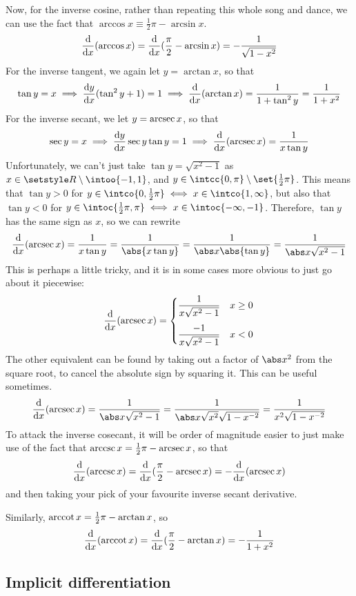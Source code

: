 Now, for the inverse cosine, rather than repeating this whole song and
dance, we can use the fact that
\(\arccos x \equiv \frac 12 \pi - \arcsin x\).
\begin{equation*}
\dv{x}(\arccos x) = \dv{x}(\frac \pi 2 - \arcsin x)
    = -\frac 1{\sqrt{1 - x^2}}
\end{equation*}
For the inverse tangent, we again let \(y = \arctan x\), so that
\begin{equation*}
\tan y = x \implies \dv<y>{x}(\tan^2 y + 1) = 1
    \implies \dv{x}(\arctan x) = \frac 1{1 + \tan^2 y}
        = \frac 1{1 + x^2}
\end{equation*}
For the inverse secant, we let \(y = \operatorname{arcsec} x\), so that
\begin{equation*}
\sec y = x \implies \dv<y>{x} \sec y \tan y = 1
    \implies \dv{x}(\arcsec x) = \frac 1{x \tan y}
\end{equation*}
Unfortunately, we can't just take \(\tan y = \sqrt{x^2 - 1}\) as
\(x \in \Reals \setminus \intoo{-1, 1}\), and
\(y \in \intcc{0, \pi} \setminus \set{\frac 12 \pi}\). This means that
\(\tan y > 0\) for
\(y \in \intco{0, \frac 12 \pi} \iff x \in \intco{1, \infty}\), but also
that \(\tan y < 0\) for
\(y \in \intoc{\frac 12 \pi, \pi} \iff x \in \intoc{-\infty, -1}\).
Therefore, \(\tan y\) has the same sign as \(x\), so we can rewrite
\begin{equation*}
\dv{x}(\arcsec x) = \frac 1{x \tan y} = \frac 1{\abs{x \tan y}}
    = \frac 1{\abs x\abs{\tan y}} = \frac 1{\abs x\sqrt{x^2 - 1}}
\end{equation*}
This is perhaps a little tricky, and it is in some cases more obvious to
just go about it piecewise:
\begin{equation*}
\dv{x}(\arcsec x) = \begin{cases}
    \dfrac 1{x\sqrt{x^2 - 1}} & x \ge 0 \\[3ex]
    \dfrac {-1}{x\sqrt{x^2 - 1}} & x < 0
\end{cases}
\end{equation*}
The other equivalent can be found by taking out a factor of \(\abs x^2\)
from the square root, to cancel the absolute sign by squaring it. This can
be useful sometimes.
\begin{equation*}
\dv{x}(\arcsec x) = \frac 1{\abs x\sqrt{x^2 - 1}}
    = \frac 1{\abs x\sqrt{x^2}\sqrt{1 - x^{-2}}}
    = \frac 1{x^2\sqrt{1 - x^{-2}}}
\end{equation*}
To attack the inverse cosecant, it will be order of magnitude easier to just
make use of the fact that \(\operatorname{arccsc} x = \frac 12 \pi - \operatorname{arcsec} x\),
so that
\begin{equation*}
\dv{x}(\arccsc x) = \dv{x}(\frac \pi 2 - \arcsec x) = -\dv{x}(\arcsec x)
\end{equation*}
and then taking your pick of your favourite inverse secant derivative.

Similarly, \(\operatorname{arccot} x = \frac 12 \pi - \arctan x\), so
\begin{equation*}
\dv{x}(\arccot x) = \dv{x}(\frac \pi 2 - \arctan x) = -\frac 1{1 + x^2}
\end{equation*}

\subsection{Implicit differentiation}


